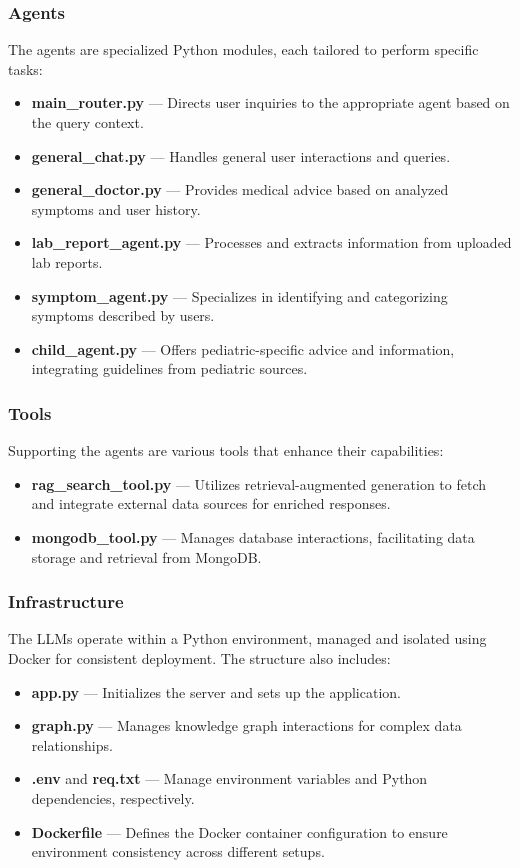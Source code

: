 \subsubsection{Agents}
The agents are specialized Python modules, each tailored to perform specific tasks:
\begin{itemize}
    \item \textbf{main\_router.py} — Directs user inquiries to the appropriate agent based on the query context.
    \item \textbf{general\_chat.py} — Handles general user interactions and queries.
    \item \textbf{general\_doctor.py} — Provides medical advice based on analyzed symptoms and user history.
    \item \textbf{lab\_report\_agent.py} — Processes and extracts information from uploaded lab reports.
    \item \textbf{symptom\_agent.py} — Specializes in identifying and categorizing symptoms described by users.
    \item \textbf{child\_agent.py} — Offers pediatric-specific advice and information, integrating guidelines from pediatric sources.
\end{itemize}

\subsubsection{Tools}
Supporting the agents are various tools that enhance their capabilities:
\begin{itemize}
    \item \textbf{rag\_search\_tool.py} — Utilizes retrieval-augmented generation to fetch and integrate external data sources for enriched responses.
    \item \textbf{mongodb\_tool.py} — Manages database interactions, facilitating data storage and retrieval from MongoDB.
\end{itemize}

\subsubsection{Infrastructure}
The LLMs operate within a Python environment, managed and isolated using Docker for consistent deployment. The structure also includes:
\begin{itemize}
    \item \textbf{app.py} — Initializes the server and sets up the application.
    \item \textbf{graph.py} — Manages knowledge graph interactions for complex data relationships.
    \item \textbf{.env} and \textbf{req.txt} — Manage environment variables and Python dependencies, respectively.
    \item \textbf{Dockerfile} — Defines the Docker container configuration to ensure environment consistency across different setups.
\end{itemize}


